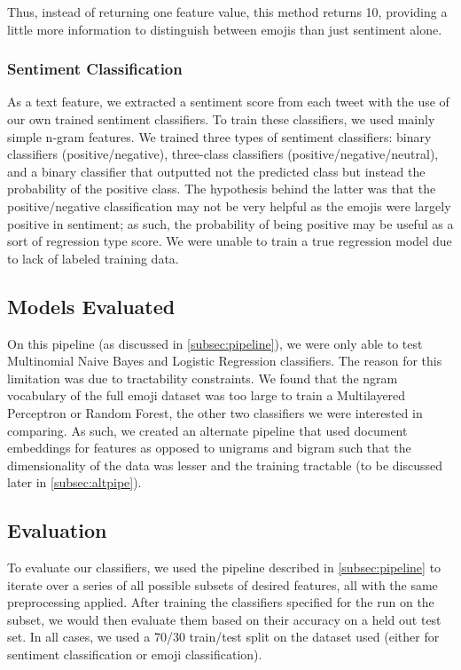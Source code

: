 \documentclass[11pt]{article}
\begin{document}
Thus, instead of returning one feature value, this method returns 10, providing a little more information to distinguish between emojis than just sentiment alone.


\subsubsection{Sentiment Classification}
As a text feature, we extracted a sentiment score from each tweet with the use of our own trained sentiment classifiers. To train these classifiers, we used mainly simple n-gram features. We trained three types of sentiment classifiers: binary classifiers (positive/negative), three-class classifiers (positive/negative/neutral), and a binary classifier that outputted not the predicted class but instead the probability of the positive class. The hypothesis behind the latter was that the positive/negative classification may not be very helpful as the emojis were largely positive in sentiment; as such, the probability of being positive may be useful as a sort of regression type score. We were unable to train a true regression model due to lack of labeled training data.

\subsection{Models Evaluated}
On this pipeline (as discussed in \ref{subsec:pipeline}), we were only able to test Multinomial Naive Bayes and Logistic Regression classifiers. The reason for this limitation was due to tractability constraints. We found that the ngram vocabulary of the full emoji dataset was too large to train a Multilayered Perceptron or Random Forest, the other two classifiers we were interested in comparing. As such, we created an alternate pipeline that used document embeddings for features as opposed to unigrams and bigram such that the dimensionality of the data was lesser and the training tractable (to be discussed later in \ref{subsec:altpipe}).

\subsection{Evaluation}
To evaluate our classifiers, we used the pipeline described in \ref{subsec:pipeline} to iterate over a series of all possible subsets of desired features, all with the same preprocessing applied. After training the classifiers specified for the run on the subset, we would then evaluate them based on their accuracy on a held out test set. In all cases, we used a 70/30 train/test split on the dataset used (either for sentiment classification or emoji classification).
\end{document}
